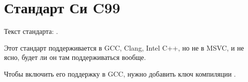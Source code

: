 ﻿\label{C99}
\section{Стандарт Си C99}

Текст стандарта: \cite{C99TC3}.

Этот стандарт поддерживается в GCC, Clang, Intel C++, но не в MSVC, и не ясно, будет ли он там поддерживаться вообще.

Чтобы включить его поддержку в GCC, нужно добавить ключ компиляции .
